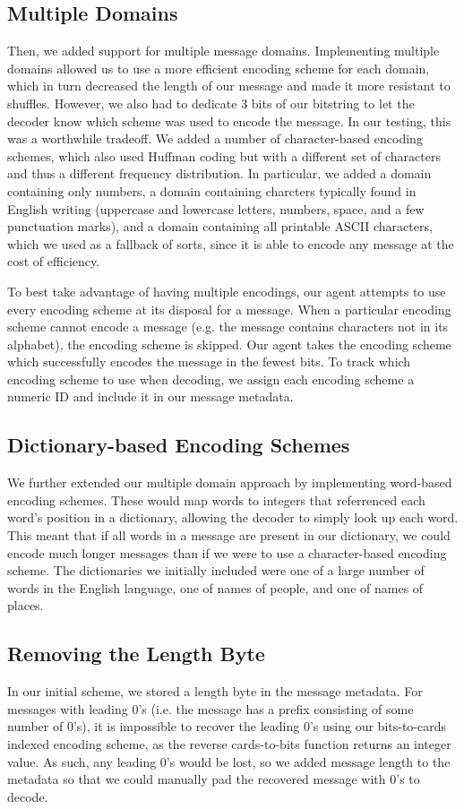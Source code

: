\documentclass[titlepage]{article}
\begin{document}
\subsection{Multiple Domains}
Then, we added support for multiple message domains. Implementing multiple domains allowed us to use a more efficient encoding scheme for each domain, which in turn decreased the length of our message and made it more resistant to shuffles. However, we also had to dedicate 3 bits of our bitstring to let the decoder know which scheme was used to encode the message. In our testing, this was a worthwhile tradeoff. We added a number of character-based encoding schemes, which also used Huffman coding but with a different set of characters and thus a different frequency distribution. In particular, we added a domain containing only numbers, a domain containing charcters typically found in English writing (uppercase and lowercase letters, numbers, space, and a few punctuation marks), and a domain containing all printable ASCII characters, which we used as a fallback of sorts, since it is able to encode any message at the cost of efficiency.

To best take advantage of having multiple encodings, our agent attempts to use every encoding scheme at its disposal for a message. When a particular encoding scheme cannot encode a message (e.g. the message contains characters not in its alphabet), the encoding scheme is skipped. Our agent takes the encoding scheme which successfully encodes the message in the fewest bits. To track which encoding scheme to use when decoding, we assign each encoding scheme a numeric ID and include it in our message metadata.

\subsection{Dictionary-based Encoding Schemes}
We further extended our multiple domain approach by implementing word-based encoding schemes. These would map words to integers that referrenced each word's position in a dictionary, allowing the decoder to simply look up each word. This meant that if all words in a message are present in our dictionary, we could encode much longer messages than if we were to use a character-based encoding scheme. The dictionaries we initially included were one of a large number of words in the English language, one of names of people, and one of names of places.

\subsection{Removing the Length Byte} \label{no_length_byte}
In our initial scheme, we stored a length byte in the message metadata. For messages with leading 0's (i.e. the message has a prefix consisting of some number of 0's), it is impossible to recover the leading 0's using our bits-to-cards indexed encoding scheme, as the reverse cards-to-bits function returns an integer value. As such, any leading 0's would be lost, so we added message length to the metadata so that we could manually pad the recovered message with 0's to decode.
\end{document}
